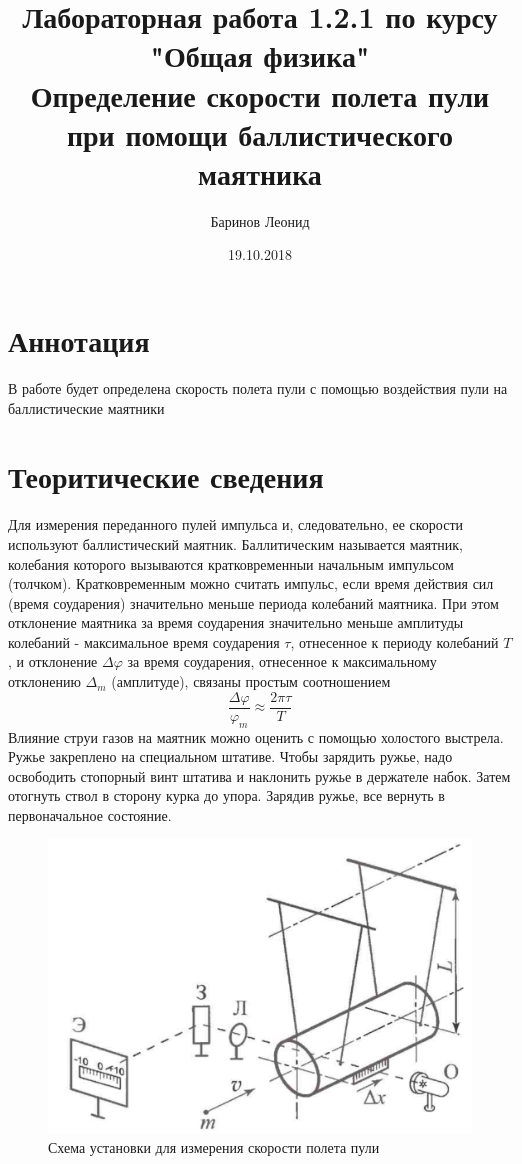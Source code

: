\documentclass[a4paper,12pt]{article} %
\title{Лабораторная работа 1.2.1 по курсу \\ "Общая физика"  \\ 
\vspace{0.2cm}
\vspace{4.5cm}
 \LARGE{\textbf{Определение скорости полета пули при помощи баллистического маятника}}\vspace{5.5cm}}
\date{19.10.2018}
\author{\vspace{0.2cm}Баринов Леонид}
\begin{document}
\maketitle

\newpage

\section{Аннотация} В работе будет определена скорость полета пули с помощью воздействия пули на баллистические маятники

\section{Теоритические сведения}
Для измерения переданного пулей импульса и, следовательно, ее скорости используют баллистический маятник. Баллитическим называется маятник, колебания которого вызываются кратковременныи начальным импульсом (толчком). Кратковременным можно считать импульс, если время действия сил (время соударения) значительно меньше периода колебаний маятника. При этом отклонение маятника за время соударения значительно меньше амплитуды колебаний - максимальное время соударения $\tau$, отнесенное к периоду колебаний $T$, и отклонение $\Delta\varphi$ за время соударения, отнесенное к максимальному отклонению $\Delta_m$ (амплитуде), связаны простым соотношением
\[\frac{\Delta\varphi}{\varphi_m}\approx\frac{2\pi\tau}{T}\]
Влияние струи газов на маятник можно оценить с помощью холостого выстрела. Ружье закреплено на специальном штативе. Чтобы зарядить ружье, надо освободить стопорный винт штатива и наклонить ружье в держателе набок. Затем отогнуть ствол в сторону курка до упора. Зарядив ружье, все вернуть в первоначальное состояние.
\begin{figure}[h]
\centering
\includegraphics[scale = 0.4]{1}
\caption{Схема установки для измерения скорости полета пули}
\end{figure}
\newpage
\end{document}
